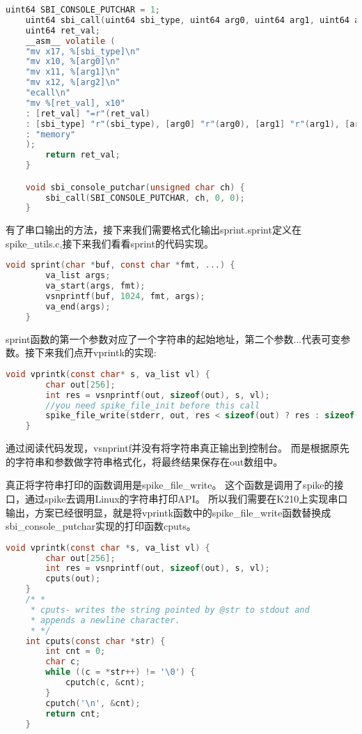 \begin{lstlisting}[language=C, caption={串口实现代码}, label={lst:serial_output} ]
    uint64 SBI_CONSOLE_PUTCHAR = 1;
    uint64 sbi_call(uint64 sbi_type, uint64 arg0, uint64 arg1, uint64 arg2) {
    uint64 ret_val;
    __asm__ volatile (
    "mv x17, %[sbi_type]\n"
    "mv x10, %[arg0]\n"
    "mv x11, %[arg1]\n"
    "mv x12, %[arg2]\n"
    "ecall\n"
    "mv %[ret_val], x10"
    : [ret_val] "=r"(ret_val)
    : [sbi_type] "r"(sbi_type), [arg0] "r"(arg0), [arg1] "r"(arg1), [arg2] "r"(arg2)
    : "memory"
    );
        return ret_val;
    }

    void sbi_console_putchar(unsigned char ch) {
        sbi_call(SBI_CONSOLE_PUTCHAR, ch, 0, 0);
    }
\end{lstlisting}

有了串口输出的方法，接下来我们需要格式化输出sprint.sprint定义在spike\_utils.c,接下来我们看看sprint的代码实现。

\begin{lstlisting}[language=C, caption={sprint实现代码}, label={lst:sprint} ]
    void sprint(char *buf, const char *fmt, ...) {
        va_list args;
        va_start(args, fmt);
        vsnprintf(buf, 1024, fmt, args);
        va_end(args);
    }
\end{lstlisting}

sprint函数的第一个参数对应了一个字符串的起始地址，第二个参数...代表可变参数。接下来我们点开vprintk的实现:

\begin{lstlisting}[language=C, caption={vprintk实现代码}, label={lst:vprintk} ]
    void vprintk(const char* s, va_list vl) {
        char out[256];
        int res = vsnprintf(out, sizeof(out), s, vl);
        //you need spike_file_init before this call
        spike_file_write(stderr, out, res < sizeof(out) ? res : sizeof(out));
    }
\end{lstlisting}

通过阅读代码发现，vsnprintf并没有将字符串真正输出到控制台。
而是根据原先的字符串和参数做字符串格式化，将最终结果保存在out数组中。

真正将字符串打印的函数调用是spike\_file\_write。
这个函数是调用了spike的接口，通过spike去调用Linux的字符串打印API。
所以我们需要在K210上实现串口输出，方案已经很明显，就是将vprintk函数中的spike\_file\_write函数替换成sbi\_console\_putchar实现的打印函数cputs。

\begin{lstlisting}[language=C, caption={vprintk改造代码}, label={lst:vprintk_dev} ]
    void vprintk(const char *s, va_list vl) {
        char out[256];
        int res = vsnprintf(out, sizeof(out), s, vl);
        cputs(out);
    }
    /* *
     * cputs- writes the string pointed by @str to stdout and
     * appends a newline character.
     * */
    int cputs(const char *str) {
        int cnt = 0;
        char c;
        while ((c = *str++) != '\0') {
            cputch(c, &cnt);
        }
        cputch('\n', &cnt);
        return cnt;
    }   
\end{lstlisting}

